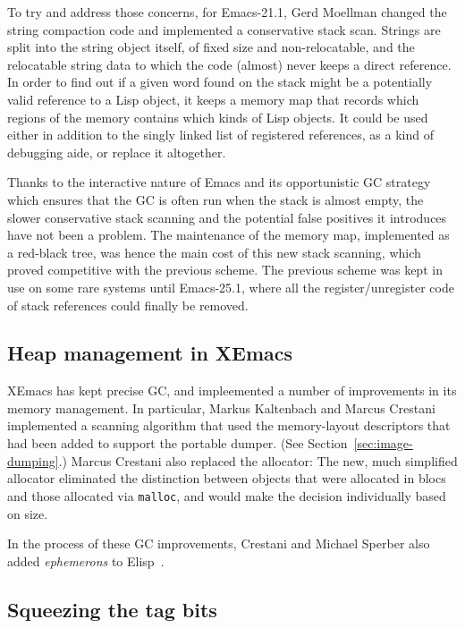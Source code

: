 \documentclass[format=acmsmall, review=false, screen=true]{acmart}
\newcommand \Elisp {Elisp}
\begin{document}
To try and address those concerns, for Emacs-21.1, Gerd
Moellman changed the string compaction code and implemented a conservative
stack scan.  Strings are split into the string object itself, of fixed size
and non-relocatable, and the relocatable string data to which the code
(almost) never keeps a direct reference.  In order to find out if a given
word found on the stack might be a potentially valid reference to a Lisp
object, it keeps a memory map that records which regions of the memory
contains which kinds of Lisp objects.  It could be used either in addition
to the singly linked list of registered references, as a kind of debugging
aide, or replace it altogether.

Thanks to the interactive nature of Emacs and its opportunistic GC strategy
which ensures that the GC is often run when the stack is almost empty, the
slower conservative stack scanning and the potential false positives it
introduces have not been a problem.  The maintenance of the memory map,
implemented as a red-black tree, was hence the main cost of this new stack
scanning, which proved competitive with the previous scheme.  The previous
scheme was kept in use on some rare systems until Emacs-25.1, where all the
register/unregister code of stack references could finally be removed.

\subsection{Heap management in XEmacs}
\label{sec:heap-xemacs}

XEmacs has kept precise GC, and impleemented a number of improvements
in its memory management.  In particular, Markus Kaltenbach and Marcus
Crestani implemented a scanning algorithm that used the memory-layout
descriptors that had been added to support the portable dumper.  (See
Section~\ref{sec:image-dumping}.)  Marcus Crestani also replaced the
allocator: The new, much simplified allocator eliminated the
distinction between objects that were allocated in blocs and those
allocated via \texttt{malloc}, and would make the decision
individually based on size.

In the process of these GC improvements, Crestani and Michael Sperber
also added \emph{ephemerons} to \Elisp{}~\cite{Hayes1997}.

\subsection{Squeezing the tag bits}
\label{sec:tag-bits}
\end{document}
